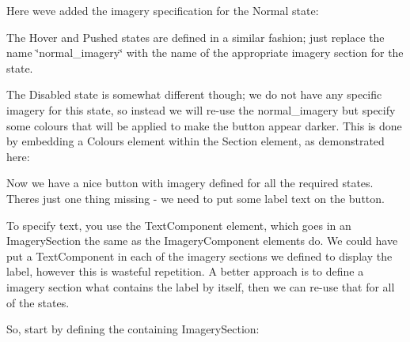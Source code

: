 Here we\textquotesingle{}ve added the imagery specification for the Normal state\+: 
\begin{DoxyCode}{0}
\DoxyCodeLine{}
\DoxyCodeLine{}
\end{DoxyCode}


The Hover and Pushed states are defined in a similar fashion; just replace the name \char`\"{}normal\+\_\+imagery\char`\"{} with the name of the appropriate imagery section for the state.

The Disabled state is somewhat different though; we do not have any specific imagery for this state, so instead we will re-\/use the normal\+\_\+imagery but specify some colours that will be applied to make the button appear darker. This is done by embedding a Colours element within the Section element, as demonstrated here\+: 
\begin{DoxyCode}{0}
\DoxyCodeLine{}
\DoxyCodeLine{      />}
\DoxyCodeLine{}
\end{DoxyCode}


Now we have a nice button with imagery defined for all the required states. There\textquotesingle{}s just one thing missing -\/ we need to put some label text on the button.

To specify text, you use the Text\+Component element, which goes in an Imagery\+Section the same as the Imagery\+Component elements do. We could have put a Text\+Component in each of the imagery sections we defined to display the label, however this is wasteful repetition. A better approach is to define a imagery section what contains the label by itself, then we can re-\/use that for all of the states.

So, start by defining the containing Imagery\+Section\+: 
\begin{DoxyCode}{0}
\DoxyCodeLine{}
\DoxyCodeLine{}
\end{DoxyCode}


